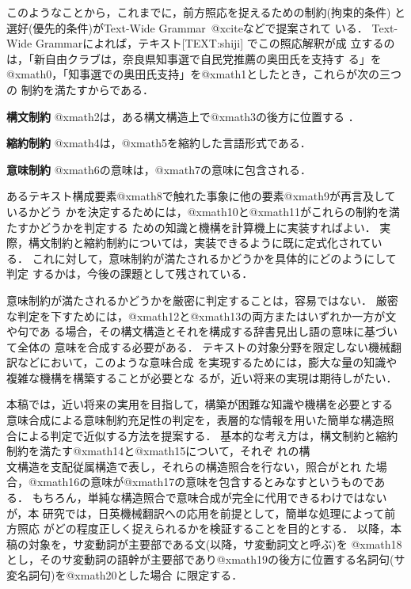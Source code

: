 このようなことから，これまでに，前方照応を捉えるための制約(拘束的条件)
と選好(優先的条件)がText-Wide Grammar~@xciteなどで提案されて
いる．
Text-Wide Grammarによれば，テキスト[TEXT:shiji] でこの照応解釈が成
立するのは，「新自由クラブは，奈良県知事選で自民党推薦の奥田氏を支持す
る」を@xmath0，「知事選での奥田氏支持」を@xmath1としたとき，これらが次の三つの
制約を満たすからである．
\smallskip
\begin{LIST}
\item[\bf 構文制約] @xmath2は，ある構文構造上で@xmath3の後方に位置する
．
\item[\bf 縮約制約] @xmath4は，@xmath5を縮約した言語形式である．
\item[\bf 意味制約] @xmath6の意味は，@xmath7の意味に包含される．
\end{LIST}
\smallskip
あるテキスト構成要素@xmath8で触れた事象に他の要素@xmath9が再言及しているかどう
かを決定するためには，@xmath10と@xmath11がこれらの制約を満たすかどうかを判定する
ための知識と機構を計算機上に実装すればよい．
実際，構文制約と縮約制約については，実装できるように既に定式化されてい
る．
これに対して，意味制約が満たされるかどうかを具体的にどのようにして判定
するかは，今後の課題として残されている．

意味制約が満たされるかどうかを厳密に判定することは，容易ではない．
厳密な判定を下すためには，@xmath12と@xmath13の両方またはいずれか一方が文や句であ
る場合，その構文構造とそれを構成する辞書見出し語の意味に基づいて全体の
意味を合成する必要がある．
テキストの対象分野を限定しない機械翻訳などにおいて，このような意味合成
を実現するためには，膨大な量の知識や複雑な機構を構築することが必要とな
るが，近い将来の実現は期待しがたい． 

本稿では，近い将来の実用を目指して，構築が困難な知識や機構を必要とする
意味合成による意味制約充足性の判定を，表層的な情報を用いた簡単な構造照
合による判定で近似する方法を提案する．
基本的な考え方は，構文制約と縮約制約を満たす@xmath14と@xmath15について，それぞ
れの構\\文構造を支配従属構造で表し，それらの構造照合を行ない，照合がとれ
た場合，@xmath16の意味が@xmath17の意味を包含するとみなすというものである．
もちろん，単純な構造照合で意味合成が完全に代用できるわけではないが，本
研究では，日英機械翻訳への応用を前提として，簡単な処理によって前方照応
がどの程度正しく捉えられるかを検証することを目的とする．
以降，本稿の対象を，サ変動詞が主要部である文(以降，サ変動詞文と呼ぶ)を
@xmath18とし，そのサ変動詞の語幹が主要部であり@xmath19の後方に位置する名詞句(サ
変名詞句)を@xmath20とした場合
に限定する．

